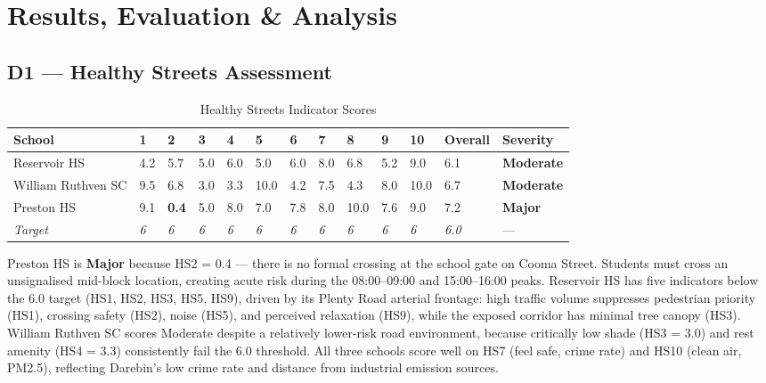 \documentclass[11pt,a4paper]{article}
\begin{document}
\newpage
\section{Results, Evaluation \& Analysis}

\subsection{D1 — Healthy Streets Assessment}

\begin{table}[H]\centering\small
\caption{Healthy Streets Indicator Scores}
\setlength{\tabcolsep}{4pt}
\begin{tabular}{L{2.8cm}C{0.5cm}C{0.5cm}C{0.5cm}C{0.5cm}C{0.5cm}C{0.5cm}C{0.5cm}C{0.5cm}C{0.5cm}C{0.6cm}C{0.85cm}C{1.5cm}}
\toprule
\textbf{School} & \textbf{1} & \textbf{2} & \textbf{3} & \textbf{4} & \textbf{5} & \textbf{6} & \textbf{7} & \textbf{8} & \textbf{9} & \textbf{10} & \textbf{Overall} & \textbf{Severity} \\
\midrule
Reservoir HS & 4.2 & 5.7 & 5.0 & 6.0 & 5.0 & 6.0 & 8.0 & 6.8 & 5.2 & 9.0 & 6.1 & \textcolor{moderateyellow}{\textbf{Moderate}} \\
William Ruthven SC & 9.5 & 6.8 & 3.0 & 3.3 & 10.0 & 4.2 & 7.5 & 4.3 & 8.0 & 10.0 & 6.7 & \textcolor{moderateyellow}{\textbf{Moderate}} \\
Preston HS & 9.1 & \textcolor{majorred}{\textbf{0.4}} & 5.0 & 8.0 & 7.0 & 7.8 & 8.0 & 10.0 & 7.6 & 9.0 & 7.2 & \textcolor{majorred}{\textbf{Major}} \\
\midrule
\textit{Target} & \textit{6} & \textit{6} & \textit{6} & \textit{6} & \textit{6} & \textit{6} & \textit{6} & \textit{6} & \textit{6} & \textit{6} & \textit{6.0} & --- \\
\bottomrule
\end{tabular}
\end{table}

Preston HS is \textbf{Major} because HS2 = 0.4 — there is no formal crossing at the school gate on Cooma Street. Students must cross an unsignalised mid-block location, creating acute risk during the 08:00--09:00 and 15:00--16:00 peaks. Reservoir HS has five indicators below the 6.0 target (HS1, HS2, HS3, HS5, HS9), driven by its Plenty Road arterial frontage: high traffic volume suppresses pedestrian priority (HS1), crossing safety (HS2), noise (HS5), and perceived relaxation (HS9), while the exposed corridor has minimal tree canopy (HS3). William Ruthven SC scores Moderate despite a relatively lower-risk road environment, because critically low shade (HS3 = 3.0) and rest amenity (HS4 = 3.3) consistently fail the 6.0 threshold. All three schools score well on HS7 (feel safe, crime rate) and HS10 (clean air, PM2.5), reflecting Darebin's low crime rate and distance from industrial emission sources.
\end{document}

